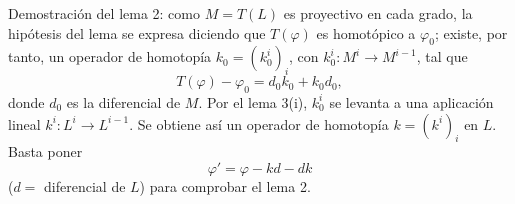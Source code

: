 Demostración del lema 2: como $M=T(L)$ es proyectivo en cada grado, la hipótesis del lema se expresa diciendo que $T(\varphi)$ es homotópico a $\varphi_0$; existe, por tanto, un operador de homotopía $k_0=(k_0^i)_i$, con $k_0^i:M^i\to M^{i-1}$, tal que
\[
T(\varphi)-\varphi_0=d_0k_0+k_0d_0,
\]
donde $d_0$ es la diferencial de $M$. Por el lema 3(i), $k_0^i$ se levanta a una aplicación lineal $k^i:L^i\to L^{i-1}$. Se obtiene así un operador de homotopía $k=(k^i)_i$ en $L$. Basta poner
\[
\varphi'=\varphi-kd-dk
\]
($d=$ diferencial de $L$) para comprobar el lema 2.
